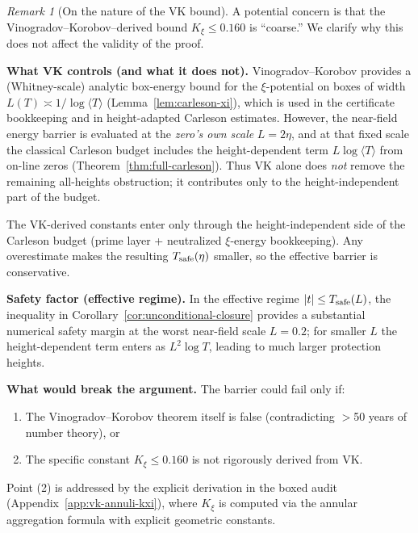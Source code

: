 \documentclass[11pt]{article}
\theoremstyle{definition}
\theoremstyle{remark}
\newtheorem{remark}[theorem]{Remark}
\theoremstyle{definition}
\begin{document}
\begin{remark}[On the nature of the VK bound]\label{rem:vk-upper-bound}
A potential concern is that the Vinogradov--Korobov--derived bound $K_\xi \le 0.160$ is ``coarse.''
We clarify why this does not affect the validity of the proof.

\smallskip\noindent
\textbf{What VK controls (and what it does not).}
Vinogradov--Korobov provides a (Whitney-scale) analytic box-energy bound for the $\xi$-potential on boxes of width $L(T)\asymp 1/\log\langle T\rangle$ (Lemma~\ref{lem:carleson-xi}), which is used in the certificate bookkeeping and in height-adapted Carleson estimates.
However, the near-field energy barrier is evaluated at the \emph{zero’s own scale} $L=2\eta$, and at that fixed scale the classical Carleson budget includes the height-dependent term $L\log\langle T\rangle$ from on-line zeros (Theorem~\ref{thm:full-carleson}). Thus VK alone does \emph{not} remove the remaining all-heights obstruction; it contributes only to the height-independent part of the budget.

The VK-derived constants enter only through the height-independent side of the Carleson budget (prime layer + neutralized $\xi$-energy bookkeeping). Any overestimate makes the resulting $T_{\rm safe}(\eta)$ smaller, so the effective barrier is conservative.

\smallskip\noindent
\textbf{Safety factor (effective regime).}
In the effective regime $|t|\le T_{\rm safe}(L)$, the inequality in Corollary~\ref{cor:unconditional-closure} provides a substantial numerical safety margin at the worst near-field scale $L=0.2$; for smaller $L$ the height-dependent term enters as $L^2\log T$, leading to much larger protection heights.

\smallskip\noindent
\textbf{What would break the argument.}
The barrier could fail only if:
\begin{enumerate}
\item The Vinogradov--Korobov theorem itself is false (contradicting $>$50 years of number theory), or
\item The specific constant $K_\xi \le 0.160$ is not rigorously derived from VK.
\end{enumerate}
Point (2) is addressed by the explicit derivation in the boxed audit (Appendix~\ref{app:vk-annuli-kxi}), where $K_\xi$ is computed via the annular aggregation formula with explicit geometric constants.


\end{remark}
\end{document}
